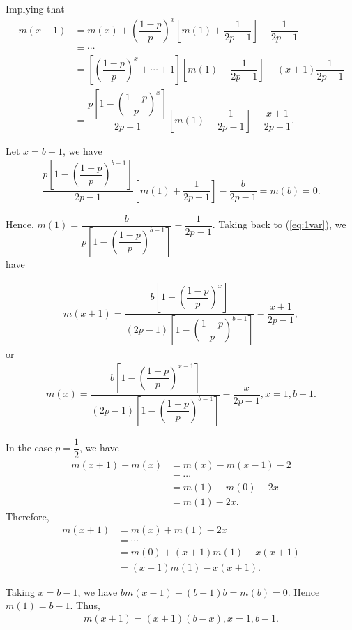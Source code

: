 Implying that
\begin{equation}
\label{eq:1var}
 \begin{aligned}
m(x+1) 
&= m(x) + \left(\dfrac{1-p}{p}\right)^x\left[m(1)+\dfrac{1}{2p-1}\right] - \dfrac{1}{2p-1}\\
&=\cdots\\
&= \left[\left(\dfrac{1-p}{p}\right)^x+\cdots+1\right]\left[m(1)+\dfrac{1}{2p-1}\right]-(x+1)\dfrac{1}{2p-1}\\
&= \dfrac{p\left[1-\left(\dfrac{1-p}{p}\right)^x\right]}{2p-1}\left[m(1)+\dfrac{1}{2p-1}\right]-\dfrac{x+1}{2p-1}.
\end{aligned}   
\end{equation}


Let $x=b-1$, we have
\begin{align*}
\dfrac{p\left[1-\left(\dfrac{1-p}{p}\right)^{b-1}\right]}{2p-1}\left[m(1)+\dfrac{1}{2p-1}\right]-\dfrac{b}{2p-1} = m(b) = 0.
\end{align*}

Hence, $m(1)=\dfrac{b}{p\left[1-\left(\dfrac{1-p}{p}\right)^{b-1}\right]}-\dfrac{1}{2p-1}$. Taking back to (\ref{eq:1var}), we have

\begin{align*}
    m(x+1) = \dfrac{b\left[1-\left(\dfrac{1-p}{p}\right)^x\right]}{(2p-1)\left[1-\left(\dfrac{1-p}{p}\right)^{b-1}\right]}-\dfrac{x+1}{2p-1},
\end{align*}
or
\begin{align*}
    m(x) = \dfrac{b\left[1-\left(\dfrac{1-p}{p}\right)^{x-1}\right]}{(2p-1)\left[1-\left(\dfrac{1-p}{p}\right)^{b-1}\right]}-\dfrac{x}{2p-1}, x=\overline{1,b-1}.
\end{align*}

In the case $p=\dfrac{1}{2}$, we have 
\begin{align*}
    m(x+1)-m(x) 
    &= m(x)-m(x-1)-2\\
    &=\cdots\\
    &=m(1)-m(0) - 2x\\
    &=m(1)-2x.
\end{align*}
Therefore,
\begin{align*}
    m(x+1)
    &= m(x)+m(1)-2x\\
    &= \cdots\\
    &= m(0)+(x+1)m(1)-x(x+1)\\
    &=(x+1)m(1) - x(x+1).
\end{align*}

Taking $x=b-1$, we have $bm(x-1)-(b-1)b = m(b) = 0$. Hence $m(1) = b-1$. Thus,
$$m(x+1) = (x+1)(b-x), x=\overline{1,b-1}.$$

